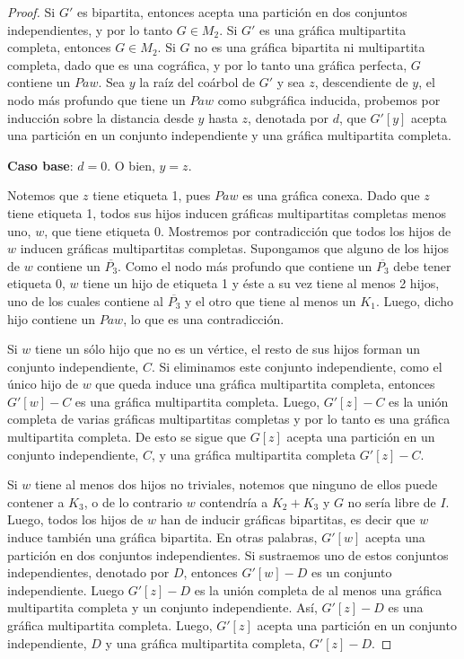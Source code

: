 \begin{proof}
    Si $G'$ es bipartita, entonces acepta una partición en dos conjuntos independientes, y por lo tanto $G \in M_2$. Si $G'$ es una gráfica multipartita completa, entonces $G \in M_2$. Si $G$ no es una gráfica bipartita ni multipartita completa, dado que es una cográfica, y por lo tanto una gráfica perfecta, $G$ contiene un $Paw$. Sea $y$ la raíz del coárbol de $G'$ y sea $z$, descendiente de $y$, el nodo más profundo que tiene un $Paw$ como subgráfica inducida, probemos por inducción sobre la distancia desde $y$ hasta $z$, denotada por $d$, que $G'[y]$ acepta una partición en un conjunto independiente y una gráfica multipartita completa.

    \textbf{Caso base}: $d = 0$. O bien, $y = z$.

    Notemos que $z$ tiene etiqueta 1, pues $Paw$ es una gráfica conexa. Dado que $z$ tiene etiqueta 1, todos sus hijos inducen gráficas multipartitas completas menos uno, $w$, que tiene etiqueta 0. Mostremos por contradicción que todos los hijos de $w$ inducen gráficas multipartitas completas. Supongamos que alguno de los hijos de $w$ contiene un $\overline{P_3}$. Como el nodo más profundo que contiene un $\overline{P_3}$ debe tener etiqueta 0, $w$ tiene un hijo de etiqueta 1 y éste a su vez tiene al menos 2 hijos, uno de los cuales contiene al $\overline{P_3}$ y el otro que tiene al menos un $K_1$. Luego, dicho hijo contiene un $Paw$, lo que es una contradicción. 
    
    Si $w$ tiene un sólo hijo que no es un vértice, el resto de sus hijos forman un conjunto independiente, $C$. Si eliminamos este conjunto independiente, como el único hijo de $w$ que queda induce una gráfica multipartita completa, entonces $G'[w] - C$ es una gráfica multipartita completa. Luego, $G'[z] - C$ es la unión completa de varias gráficas multipartitas completas y por lo tanto es una gráfica multipartita completa. De esto se sigue que $G[z]$ acepta una partición en un conjunto independiente, $C$, y una gráfica multipartita completa $G'[z] - C$. 
    
    Si $w$ tiene al menos dos hijos no triviales, notemos que ninguno de ellos puede contener a $K_3$, o de lo contrario $w$ contendría a $K_2+K_3$ y $G$ no sería libre de $I$. Luego, todos los hijos de $w$ han de inducir gráficas bipartitas, es decir que $w$ induce también una gráfica bipartita. En otras palabras, $G'[w]$ acepta una partición en dos conjuntos independientes. Si sustraemos uno de estos conjuntos independientes, denotado por $D$, entonces $G'[w]-D$ es un conjunto independiente. Luego $G'[z]-D$ es la unión completa de al menos una gráfica multipartita completa y un conjunto independiente. Así, $G'[z]-D$ es una gráfica multipartita completa. Luego, $G'[z]$ acepta una partición en un conjunto independiente, $D$ y una gráfica multipartita completa, $G'[z] - D$.


\end{proof}
